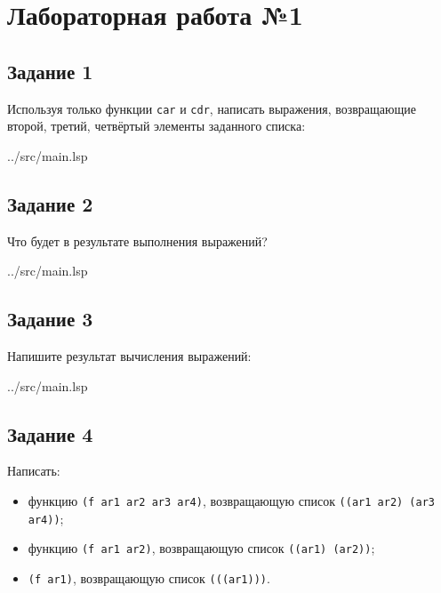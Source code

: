 \chapter*{Лабораторная работа №1}

\section*{Задание 1}

Используя только функции {\texttt{car}} и {\texttt{cdr}}, написать выражения, возвращающие второй, третий, четвёртый элементы заданного списка:

\begin{lstinputlisting}[
	caption={Задание 1},
	label={lst:t1},
	style={lsp},
	linerange={3-7},
	]{../src/main.lsp}
\end{lstinputlisting}

\section*{Задание 2}

Что будет в результате выполнения выражений?

\begin{lstinputlisting}[
	caption={Задание 2},
	label={lst:t2},
	style={lsp},
	linerange={11-14},
	]{../src/main.lsp}
\end{lstinputlisting}

\section*{Задание 3}

Напишите результат вычисления выражений:

\begin{lstinputlisting}[
	caption={Задание 2},
	label={lst:t2},
	style={lsp},
	linerange={16-31},
	]{../src/main.lsp}
\end{lstinputlisting}

\section*{Задание 4}

Написать:
\begin{itemize}
	\item функцию {\texttt{(f ar1 ar2 ar3 ar4)}}, возвращающую список {\texttt{((ar1 ar2) (ar3 ar4))}};
	\item функцию {\texttt{(f ar1 ar2)}}, возвращающую список {\texttt{((ar1) (ar2))}};
	\item {\texttt{(f ar1)}}, возвращающую список {\texttt{(((ar1)))}}.
\end{itemize}

